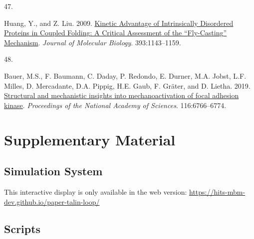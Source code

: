\documentclass[
  twocolumn]{biophys-new-mod}
\newlength{\cslhangindent}
\newlength{\csllabelwidth}
\newlength{\cslentryspacingunit} %
\newenvironment{CSLReferences}[2] %
 {%
  \setlength{\parindent}{0pt}
  \ifodd #1
  \let\oldpar\par
  \def\par{\hangindent=\cslhangindent\oldpar}
  \fi
  \setlength{\parskip}{#2\cslentryspacingunit}
 }%
 {}
\newcommand{\CSLLeftMargin}[1]{\parbox[t]{\csllabelwidth}{#1}}
\newcommand{\CSLRightInline}[1]{\parbox[t]{\linewidth - \csllabelwidth}{#1}\break}
\begin{document}
\begin{CSLReferences}{0}{0}
\leavevmode{}%
\CSLLeftMargin{47. }%
\CSLRightInline{Huang, Y., and Z. Liu. 2009.
\href{https://doi.org/10.1016/j.jmb.2009.09.010}{Kinetic {Advantage} of
{Intrinsically Disordered Proteins} in {Coupled
Folding}\textendash{{Binding Process}}: {A Critical Assessment} of the
{``{Fly-Casting}''} {Mechanism}}. \emph{Journal of Molecular Biology}.
393:1143--1159.}

\leavevmode{}%
\CSLLeftMargin{48. }%
\CSLRightInline{Bauer, M.S., F. Baumann, C. Daday, P. Redondo, E.
Durner, M.A. Jobst, L.F. Milles, D. Mercadante, D.A. Pippig, H.E. Gaub,
F. Gräter, and D. Lietha. 2019.
\href{https://doi.org/10.1073/pnas.1820567116}{Structural and
mechanistic insights into mechanoactivation of focal adhesion kinase}.
\emph{Proceedings of the National Academy of Sciences}. 116:6766--6774.}

\end{CSLReferences}

\hypertarget{supplementary-material}{%
\section{Supplementary Material}\label{supplementary-material}}

\hypertarget{sec-system}{%
\subsection{Simulation System}\label{sec-system}}

\begin{tcolorbox}[enhanced jigsaw, colbacktitle=quarto-callout-note-color!10!white, breakable, colframe=quarto-callout-note-color-frame, rightrule=.15mm, colback=white, toprule=.15mm, coltitle=black, opacitybacktitle=0.6, leftrule=.75mm, left=2mm, titlerule=0mm, opacityback=0, title=\textcolor{quarto-callout-note-color}{\faInfo}\hspace{0.5em}{Note}, bottomtitle=1mm, toptitle=1mm, arc=.35mm, bottomrule=.15mm]
This interactive display is only available in the web version:
\url{https://hits-mbm-dev.github.io/paper-talin-loop/}
\end{tcolorbox}

\hypertarget{scripts}{%
\subsection{Scripts}\label{scripts}}
\end{document}
